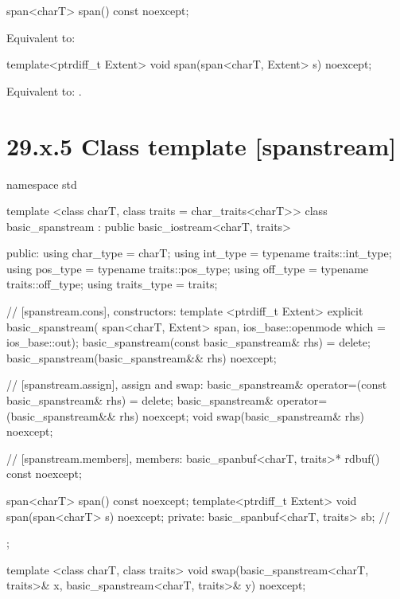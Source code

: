 \documentclass[ebook,11pt,article]{memoir}
\renewcommand{\iref}[1]{[#1]}
\begin{document}
\begin{itemdecl}
span<charT> span() const noexcept;
\end{itemdecl}

\begin{itemdescr}
\pnum
\effects Equivalent to: \\
\end{itemdescr}

\begin{itemdecl}
template<ptrdiff_t Extent>
void span(span<charT, Extent> s) noexcept;
\end{itemdecl}

\begin{itemdescr}
\pnum
\effects
Equivalent to:
.
\end{itemdescr}

\section{29.x.5 Class template  [spanstream] }

\begin{codeblock}
namespace std {
  template <class charT, class traits = char_traits<charT>>
  class basic_spanstream
    : public basic_iostream<charT, traits> {
  public:
    using char_type      = charT;
    using int_type       = typename traits::int_type;
    using pos_type       = typename traits::pos_type;
    using off_type       = typename traits::off_type;
    using traits_type    = traits;

    // \iref{spanstream.cons}, constructors:
    template <ptrdiff_t Extent>
    explicit basic_spanstream(
      span<charT, Extent> span,
      ios_base::openmode which = ios_base::out);
    basic_spanstream(const basic_spanstream& rhs) = delete;
    basic_spanstream(basic_spanstream&& rhs) noexcept;

    // \iref{spanstream.assign}, assign and swap:
    basic_spanstream& operator=(const basic_spanstream& rhs) = delete;
    basic_spanstream& operator=(basic_spanstream&& rhs) noexcept;
    void swap(basic_spanstream& rhs) noexcept;

    // \iref{spanstream.members}, members:
    basic_spanbuf<charT, traits>* rdbuf() const noexcept;

    span<charT> span() const noexcept;
	template<ptrdiff_t Extent>
    void span(span<charT> s) noexcept;
  private:
    basic_spanbuf<charT, traits> sb; // \expos
  };

  template <class charT, class traits>
    void swap(basic_spanstream<charT, traits>& x,
              basic_spanstream<charT, traits>& y) noexcept;
}
\end{codeblock}
\end{document}
